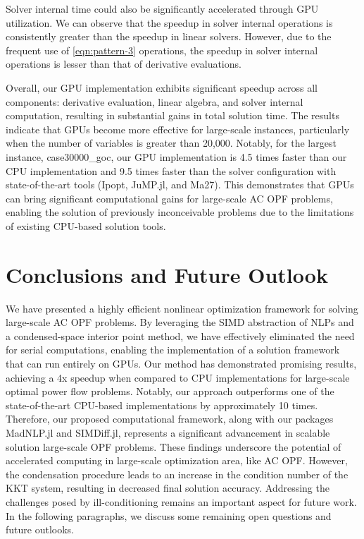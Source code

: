 Solver internal time could also be significantly accelerated through
GPU utilization. We can observe that the speedup in solver internal
operations is consistently greater than the speedup in linear
solvers. However, due to the frequent use of \ref{eqn:pattern-3}
operations, the speedup in solver internal operations is lesser than
that of derivative evaluations.

Overall, our GPU implementation exhibits significant speedup across
all components: derivative evaluation, linear algebra, and solver
internal computation, resulting in substantial gains in total solution
time. The results indicate that GPUs become more effective for
large-scale instances, particularly when the number of variables is
greater than 20,000. Notably, for the largest instance,
case30000\_goc, our GPU implementation is 4.5 times faster than our
CPU implementation and 9.5 times faster than the solver configuration
with state-of-the-art tools (Ipopt, JuMP.jl, and Ma27). This demonstrates
that GPUs can bring significant computational gains for large-scale AC
OPF problems, enabling the solution of previously inconceivable
problems due to the limitations of existing CPU-based solution tools.


\section{Conclusions and Future Outlook}\label{sec:conc}
We have presented a highly efficient nonlinear optimization framework
for solving large-scale AC OPF problems. By leveraging the SIMD
abstraction of NLPs and a condensed-space interior point method, we
have effectively eliminated the need for serial computations, enabling
the implementation of a solution framework that can run entirely on
GPUs. Our method has demonstrated promising results, achieving a 4x
speedup when compared to CPU implementations for large-scale optimal
power flow problems. Notably, our approach outperforms one of the
state-of-the-art CPU-based implementations by approximately 10
times. Therefore, our proposed computational framework, along with our
packages MadNLP.jl and SIMDiff.jl, represents a significant
advancement in scalable solution large-scale OPF problems. These
findings underscore the potential of accelerated computing
in large-scale optimization area, like AC OPF. However,
the condensation procedure leads to an increase in the condition
number of the KKT system, resulting in decreased final solution
accuracy. Addressing the challenges posed by ill-conditioning remains
an important aspect for future work. In the following paragraphs, we
discuss some remaining open questions and future outlooks.

